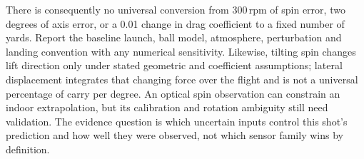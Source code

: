 There is consequently no universal conversion from 300\,rpm of spin error, two degrees of axis error, or a 0.01 change in drag coefficient to a fixed number of yards.
Report the baseline launch, ball model, atmosphere, perturbation and landing convention with any numerical sensitivity.
Likewise, tilting spin changes lift direction only under stated geometric and coefficient assumptions; lateral displacement integrates that changing force over the flight and is not a universal percentage of carry per degree.
An optical spin observation can constrain an indoor extrapolation, but its calibration and rotation ambiguity still need validation.
The evidence question is which uncertain inputs control this shot's prediction and how well they were observed, not which sensor family wins by definition.
